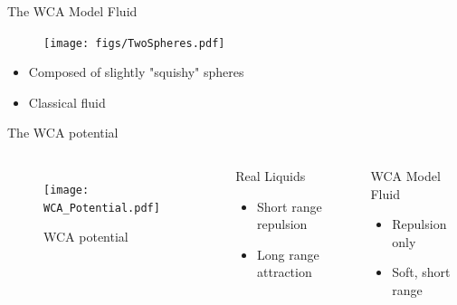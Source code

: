 \documentclass{beamer}
\begin{document}
\begin{frame}{The WCA Model Fluid}
    \begin{figure}
        \centering
        \texttt{[image: figs/TwoSpheres.pdf]} 
        \label{fig:TwoSpheres}
    \end{figure} 
    
    \begin{itemize}
		\item Composed of slightly "squishy" spheres
		\item Classical fluid
	\end{itemize}

\end{frame}    

\begin{frame}{The WCA potential}
	\begin{columns}[t]
        \begin{figure}
            \centering
            \texttt{[image: WCA\_Potential.pdf]}
            \caption{WCA potential}
            \label{fig:WCA_potential}
          \end{figure}
		\begin{block}{Real Liquids}
			\begin{itemize}
				\item Short range repulsion 
				\item Long range attraction 
			\end{itemize}
		\end{block}
		\begin{block}{WCA Model Fluid}
			\begin{itemize}
				\item Repulsion only
				\item Soft, short range
			\end{itemize}
		\end{block}
	\end{columns}	
\end{frame}
\end{document}
